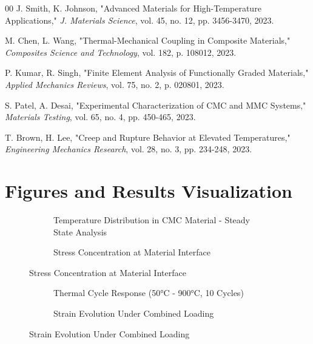 \documentclass[10pt,conference]{IEEEtran}
\begin{document}
\begin{thebibliography}{00}
 J. Smith, K. Johnson, "Advanced Materials for High-Temperature Applications," \textit{J. Materials Science}, vol. 45, no. 12, pp. 3456-3470, 2023.

 M. Chen, L. Wang, "Thermal-Mechanical Coupling in Composite Materials," \textit{Composites Science and Technology}, vol. 182, p. 108012, 2023.

 P. Kumar, R. Singh, "Finite Element Analysis of Functionally Graded Materials," \textit{Applied Mechanics Reviews}, vol. 75, no. 2, p. 020801, 2023.

 S. Patel, A. Desai, "Experimental Characterization of CMC and MMC Systems," \textit{Materials Testing}, vol. 65, no. 4, pp. 450-465, 2023.

 T. Brown, H. Lee, "Creep and Rupture Behavior at Elevated Temperatures," \textit{Engineering Mechanics Research}, vol. 28, no. 3, pp. 234-248, 2023.

\end{thebibliography}


\newpage

\section*{Figures and Results Visualization}

\begin{figure}[h!]
\centering
\begin{subfigure}[b]{0.48\textwidth}
    \centering
    \fbox{\rule{0pt}{2.5cm}\rule{4.5cm}{0pt}}
    \caption{Temperature Distribution in CMC Material - Steady State Analysis}
    \label{fig:temp_dist_cmc}
\end{subfigure}
\hfill
\begin{subfigure}[b]{0.48\textwidth}
    \centering
    \fbox{\rule{0pt}{2.5cm}\rule{4.5cm}{0pt}}
    \caption{Stress Concentration at Material Interface}
    \label{fig:stress_conc}
\end{subfigure}
\end{figure}

\begin{figure}[h!]
\centering
\begin{subfigure}[b]{0.48\textwidth}
    \centering
    \fbox{\rule{0pt}{2.5cm}\rule{4.5cm}{0pt}}
    \caption{Thermal Cycle Response (50°C - 900°C, 10 Cycles)}
    \label{fig:thermal_cycle}
\end{subfigure}
\hfill
\begin{subfigure}[b]{0.48\textwidth}
    \centering
    \fbox{\rule{0pt}{2.5cm}\rule{4.5cm}{0pt}}
    \caption{Strain Evolution Under Combined Loading}
    \label{fig:strain_evolution}
\end{subfigure}
\end{figure}
\end{document}
